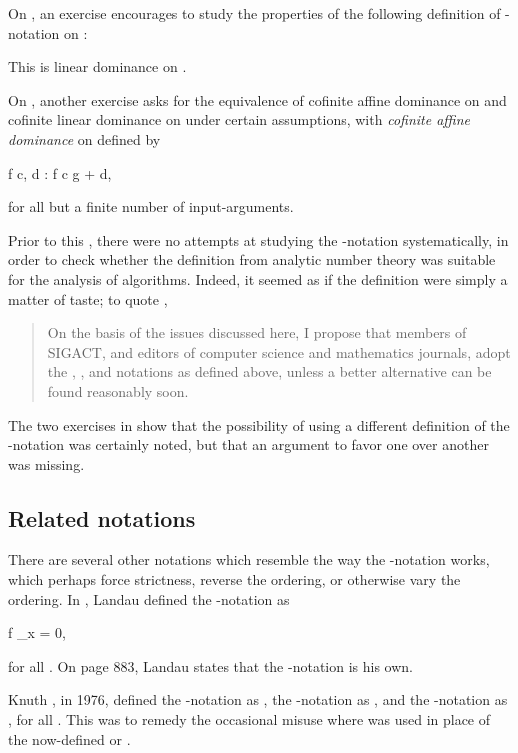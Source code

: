 \documentclass[b5paper, english, oneside]{memoir}
\begin{document}
On \cite[page 39]{DesignAndAnalysisOfComputerAlgorithms}, an exercise encourages to study the properties of the following definition of -notation on :

This is linear dominance on . 

On \cite[page 39]{DesignAndAnalysisOfComputerAlgorithms}, another exercise asks for the equivalence of cofinite affine dominance on  and cofinite linear dominance on  under certain assumptions, with \emph{cofinite affine dominance} on  defined by
\begin{eqs}
f \in {} \coloniff \exists c, d \in \posi{\TR}: f \leq c g + d,
\end{eqs}
for all but a finite number of input-arguments. 

Prior to this \manuscript{}, there were no attempts at studying the -notation systematically, in order to check whether the definition from analytic number theory was suitable for the analysis of algorithms. Indeed, it seemed as if the definition were simply a matter of taste; to quote \cite{BigOmega},

\begin{quotation}
On the basis of the issues discussed here, I propose that members of SIGACT, and editors of
computer science and mathematics journals, adopt the , , and  notations as defined above, unless a better alternative can be found reasonably soon. 
\end{quotation}

The two exercises in \cite{DesignAndAnalysisOfComputerAlgorithms} show that the possibility of using a different definition of the -notation was certainly noted, but that an argument to favor one over another was missing. 

\subsection{Related notations}

There are several other notations which resemble the way the -notation works, which perhaps force strictness, reverse the ordering, or otherwise vary the ordering. In \cite[page 61]{SmallOh}, Landau defined the -notation as
\begin{eqs}
f \in {} \coloniff \lim_{x \to \infty}  = 0,
\end{eqs}
for all . On page 883, Landau states that the -notation is his own.

Knuth \cite{BigOmega}, in 1976, defined the -notation as
,
the -notation as 
,
and the -notation as
,
for all . This was to remedy the occasional misuse where  was used in place of the now-defined  or .
\end{document}
